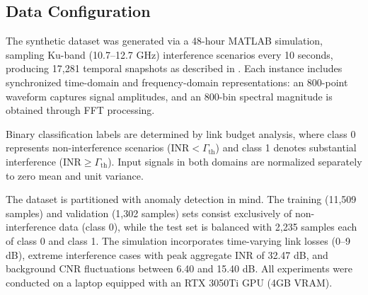 \documentclass[conference]{IEEEtran}
\begin{document}

\subsection{Data Configuration}

The synthetic dataset was generated via a 48-hour MATLAB simulation, sampling Ku-band (10.7–12.7 GHz) interference scenarios every 10 seconds, producing 17,281 temporal snapshots as described in \cite{saifaldawlaGenAIBasedModelsNGSO2024}. Each instance includes synchronized time-domain and frequency-domain representations: an 800-point waveform captures signal amplitudes, and an 800-bin spectral magnitude is obtained through FFT processing.

Binary classification labels are determined by link budget analysis, where class 0 represents non-interference scenarios ($\text{INR} < \Gamma_{\text{th}}$) and class 1 denotes substantial interference ($\text{INR} \geq \Gamma_{\text{th}}$). Input signals in both domains are normalized separately to zero mean and unit variance.

The dataset is partitioned with anomaly detection in mind. The training (11,509 samples) and validation (1,302 samples) sets consist exclusively of non-interference data (class 0), while the test set is balanced with 2,235 samples each of class 0 and class 1. The simulation incorporates time-varying link losses (0–9 dB), extreme interference cases with peak aggregate INR of 32.47 dB, and background CNR fluctuations between 6.40 and 15.40 dB. All experiments were conducted on a laptop equipped with an RTX 3050Ti GPU (4GB VRAM).



\end{document}
